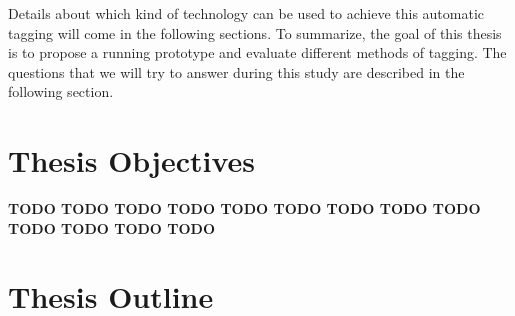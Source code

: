 Details about which kind of technology can be 	used to achieve this automatic tagging will come in the following sections. To summarize, the goal of this thesis is to propose a running prototype and evaluate different methods of tagging. The questions that we will try to answer during this study are described in the following section.


\section{Thesis Objectives} %
\label{sec:thesis_objectives}
\textbf{TODO TODO TODO TODO TODO TODO TODO TODO TODO TODO TODO TODO TODO }


\section{Thesis Outline} %
\label{sec:thesis_outline}

